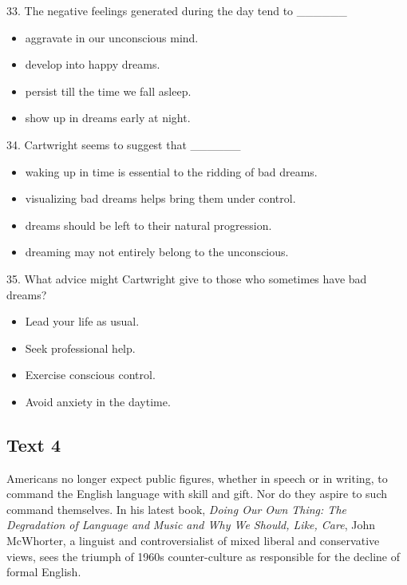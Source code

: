 \documentclass[UTF8,11pt]{ctexart}
\begin{document}
33. The negative feelings generated during the day tend to \_\_\_\_\_\_


\begin{itemize}[leftmargin=2em,itemsep=.2em,topsep=.4em]\item[A.] aggravate in our unconscious mind.
\item[B.] develop into happy dreams.
\item[C.] persist till the time we fall asleep.
\item[D.] show up in dreams early at night.
\end{itemize}

34. Cartwright seems to suggest that \_\_\_\_\_\_


\begin{itemize}[leftmargin=2em,itemsep=.2em,topsep=.4em]\item[A.] waking up in time is essential to the ridding of bad dreams.
\item[B.] visualizing bad dreams helps bring them under control.
\item[C.] dreams should be left to their natural progression.
\item[D.] dreaming may not entirely belong to the unconscious.
\end{itemize}

35. What advice might Cartwright give to those who sometimes have bad dreams?


\begin{itemize}[leftmargin=2em,itemsep=.2em,topsep=.4em]\item[A.] Lead your life as usual.
\item[B.] Seek professional help.
\item[C.] Exercise conscious control.
\item[D.] Avoid anxiety in the daytime.
\end{itemize}

\subsection*{\textbf{Text 4}}


Americans no longer expect public figures, whether in speech or in writing, to command the English language with skill and gift. Nor do they aspire to such command themselves. In his latest book, \textit{Doing Our Own Thing: The Degradation of Language and} \textit{Music and Why We Should, Like, Care}, John McWhorter, a linguist and controversialist of mixed liberal and conservative views, sees the triumph of 1960s counter-culture as responsible for the decline of formal English.
\end{document}
